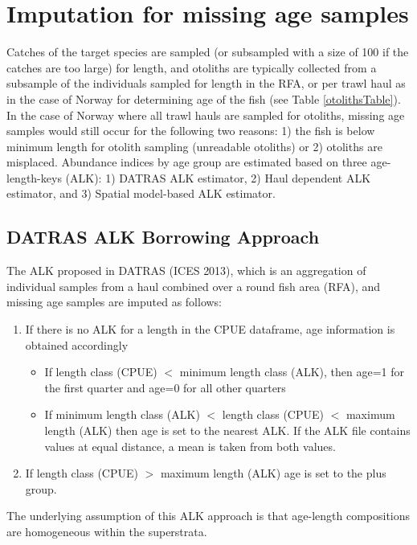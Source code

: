 \documentclass[a4paper 12pt]{article}
\numberwithin{equation}{section}
\begin{document}
\section{\large Imputation for missing age samples}
\label{sec:imputationappendix}
Catches of the target species are sampled (or subsampled with a size of 100 if the catches are too large) for length, and otoliths are typically collected from a subsample of the individuals sampled for length in the RFA,  or per trawl haul as in the case of Norway for determining age of the fish (see Table \ref{otolithsTable}). In the case of Norway where all trawl hauls are sampled for otoliths, missing age samples would still occur for the following two reasons: 1) the fish is below minimum length for otolith sampling (unreadable otoliths) or 2) otoliths are misplaced. Abundance indices by age group are estimated based on three age-length-keys (ALK): 1) DATRAS ALK estimator, 2) Haul dependent ALK estimator, and 3) Spatial model-based ALK estimator.
\subsection{\normalsize DATRAS ALK Borrowing Approach}
\label{secAp:DATRASBorrow}
The ALK proposed in DATRAS (ICES 2013), which is an aggregation of individual samples from a haul combined over a round fish area (RFA), and missing age samples are imputed as follows: 
\begin{enumerate}
\item If there is no ALK for a length in the CPUE dataframe, age information is obtained accordingly
\begin{itemize}
\item If length class (CPUE) $<$ minimum length class (ALK), then age=1 for the first quarter and age=0 for all other quarters
\item  If minimum length class (ALK) $<$ length class (CPUE) $<$ maximum length (ALK) then age is set to the nearest ALK. If the ALK file contains values at equal distance, a mean is taken from both values. 
\end{itemize}
\item If length class (CPUE) $>$ maximum length (ALK) age is set to the plus group.
\end{enumerate}
The underlying assumption of this ALK approach is that age-length compositions are homogeneous within the superstrata. 
\end{document}
